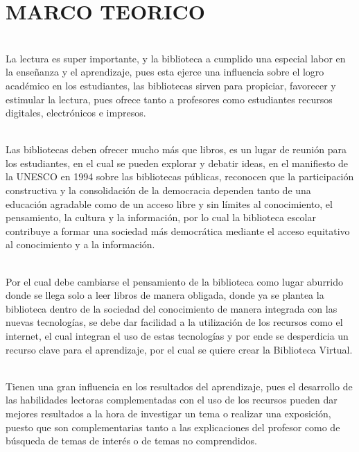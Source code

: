 \section{MARCO TEORICO} 

\begin{enumerate}[1.]
	
	\\ La lectura es super importante, y la biblioteca a cumplido una especial labor en la enseñanza y el aprendizaje, pues esta ejerce una influencia sobre el logro académico en los estudiantes, las bibliotecas sirven para propiciar, favorecer y estimular la lectura, pues ofrece tanto a profesores como estudiantes recursos digitales, electrónicos e impresos. 
	
	\\ Las bibliotecas deben ofrecer mucho más que libros, es un lugar de reunión para los estudiantes, en el cual se pueden explorar y debatir ideas, en el manifiesto de la UNESCO en 1994 sobre las bibliotecas públicas, reconocen que la participación constructiva y la consolidación de la democracia dependen tanto de una educación agradable como de un acceso libre y sin límites al conocimiento, el pensamiento, la cultura y la información, por lo cual la biblioteca escolar contribuye a formar una sociedad más democrática mediante el acceso equitativo al conocimiento y a la información.
	
	\\ Por el cual debe cambiarse el pensamiento de la biblioteca como lugar aburrido donde se llega solo a leer libros de manera obligada, donde ya se plantea la biblioteca dentro de la sociedad del conocimiento de manera integrada con las nuevas tecnologías, se debe dar facilidad a la utilización de los recursos como el internet, el cual integran el uso de estas tecnologías y por ende se desperdicia un recurso clave para el aprendizaje, por el cual se quiere crear la Biblioteca Virtual.
	
	\\ Tienen una gran influencia en los resultados del aprendizaje, pues el desarrollo de las habilidades lectoras complementadas con el uso de los recursos pueden dar mejores resultados a la hora de investigar un tema o realizar una exposición, puesto que son complementarias tanto a las explicaciones del profesor como de búsqueda de temas de interés o de temas no comprendidos. 
	

\end{enumerate}
